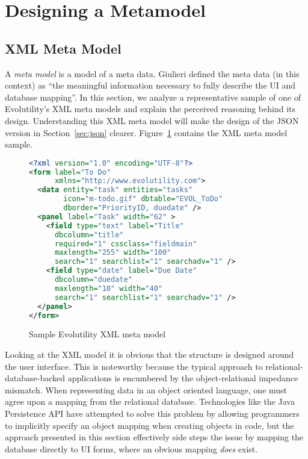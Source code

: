 \section{Designing a Metamodel} \label{sec:metamodel}


\subsection{XML Meta Model}  \label{sec:xml}

A \textit{meta model} is a model of a meta data. Giulieri defined the meta data
(in this context) as ``the meaningful information necessary to fully describe
the UI and database mapping''. In this section, we analyze a representative
sample of one of Evolutility's XML meta models and explain the perceived
reasoning behind its design. Understanding this XML meta model will make the
design of the JSON version in Section~\ref{sec:json} clearer.
Figure~\ref{fig:xml} contains the XML meta model sample.

\begin{figure}[h!]
\centering

\begin{lstlisting}[language=XML]
<?xml version="1.0" encoding="UTF-8"?>
<form label="To Do"  
      xmlns="http://www.evolutility.com">
  <data entity="task" entities="tasks" 
        icon="m-todo.gif" dbtable="EVOL_ToDo" 
        dborder="PriorityID, duedate" />
  <panel label="Task" width="62" >
    <field type="text" label="Title" 
      dbcolumn="title"
      required="1" cssclass="fieldmain" 
      maxlength="255" width="100" 
      search="1" searchlist="1" searchadv="1" />
    <field type="date" label="Due Date" 
      dbcolumn="duedate" 
      maxlength="10" width="40" 
      search="1" searchlist="1" searchadv="1" />
  </panel>
</form> 
\end{lstlisting}
\caption{Sample Evolutility XML meta model}
\label{fig:xml}
\end{figure}

Looking at the XML model it is obvious that the structure is designed around the
user interface. This is noteworthy because the typical approach to
relational-database-backed applications is encumbered by the object-relational
impedance mismatch. When representing data in an object oriented language, one
must agree upon a mapping from the relational database. Technologies like the
Java Persistence API have attempted to solve this problem by allowing
programmers to implicitly specify an object mapping when creating objects in
code\cite{oracle_java_????}, but the approach presented in this section
effectively side steps the issue by mapping the database directly to UI forms,
where an obvious mapping \textit{does} exist.

